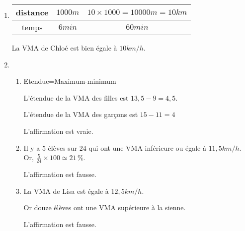 
\begin{enumerate}

\item \begin{tabular}{|c|c|c|}
\hline 
distance  & $1000m$ & $10 \times 1000=10000m=10km$ \\ \hline 
temps & $6min$ & $60min$ \\ \hline 
\end{tabular} 

La VMA de Chloé est bien égale à $10 km/h$.
\item
\begin{enumerate}
\item Etendue=Maximum-minimum

L'étendue de la VMA des filles est $13,5-9=4,5$.

L'étendue de la VMA des garçons est $15-11=4$

L'affirmation est vraie.
\item Il y a $5$ élèves sur $24$ qui ont une VMA inférieure ou égale à $11,5 km/h$. Or,
$\frac{5}{24}\times 100\simeq 21\,\%$. 


L'affirmation est fausse.


\item La VMA de Lisa est égale à $12,5 km/h$.


Or douze élèves ont une VMA supérieure à la sienne. 


L'affirmation est fausse.
\end{enumerate}
\end{enumerate}


